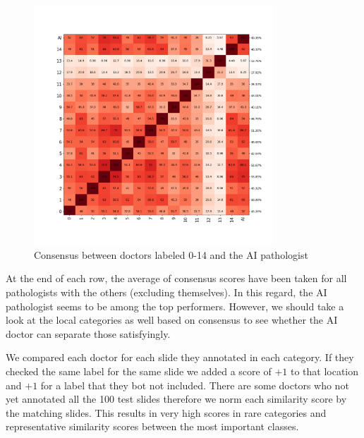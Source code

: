 \documentclass[a4paper,12pt]{article}
\begin{document}
\begin{figure}[H]
    \centering
    \includegraphics[width=0.8\textwidth]{results/consensus.png}
    \caption{Consensus between doctors labeled 0-14 and the AI pathologist}
    \label{fig:my_label}
\end{figure}

\vspace{4mm}

\par At the end of each row, the average of consensus scores have been taken for all pathologists with the others (excluding themselves). In this regard, the AI pathologist seems to be among the top performers. However, we should take a look at the local categories as well based on consensus to see whether the AI doctor can separate those satisfyingly.

\vspace{4mm}

\par We compared each doctor for each slide they annotated in each category. If they checked the same label for the same slide we added a score of $+1$ to that location and $+1$ for a label that they bot not included. There are some doctors who not yet annotated all the 100 test slides therefore we norm each similarity score by the matching slides. This results in very high scores in rare categories and representative similarity scores between the most important classes.

\vspace{4mm}
\end{document}
